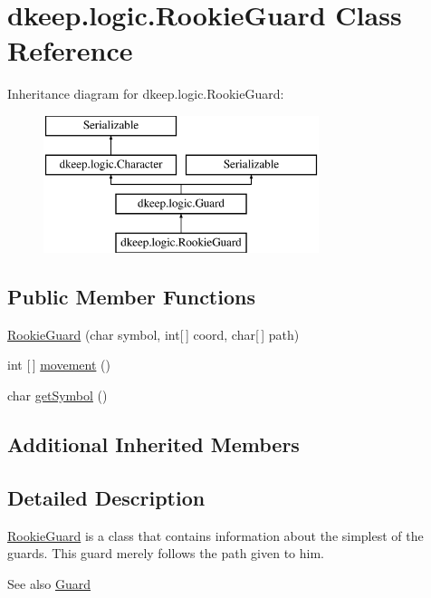 \hypertarget{classdkeep_1_1logic_1_1_rookie_guard}{}\section{dkeep.\+logic.\+Rookie\+Guard Class Reference}
\label{classdkeep_1_1logic_1_1_rookie_guard}
Inheritance diagram for dkeep.\+logic.\+Rookie\+Guard\+:\begin{figure}[H]
\begin{center}
\leavevmode
\includegraphics[height=4.000000cm]{classdkeep_1_1logic_1_1_rookie_guard}
\end{center}
\end{figure}
\subsection*{Public Member Functions}
\begin{DoxyCompactItemize}
\item 
\hyperlink{classdkeep_1_1logic_1_1_rookie_guard_ae9559d0efe10dbe17b8d923be52388ea}{Rookie\+Guard} (char symbol, int\mbox{[}$\,$\mbox{]} coord, char\mbox{[}$\,$\mbox{]} path)
\item 
int \mbox{[}$\,$\mbox{]} \hyperlink{classdkeep_1_1logic_1_1_rookie_guard_ae78bec3a34dbd5cbac6a90af92fd7984}{movement} ()
\item 
char \hyperlink{classdkeep_1_1logic_1_1_rookie_guard_a5e7a7811e8689941b19bd990d947bafd}{get\+Symbol} ()
\end{DoxyCompactItemize}
\subsection*{Additional Inherited Members}


\subsection{Detailed Description}
\hyperlink{classdkeep_1_1logic_1_1_rookie_guard}{Rookie\+Guard} is a class that contains information about the simplest of the guards. This guard merely follows the path given to him. \begin{DoxySeeAlso}{See also}
\hyperlink{classdkeep_1_1logic_1_1_guard}{Guard} 
\end{DoxySeeAlso}


